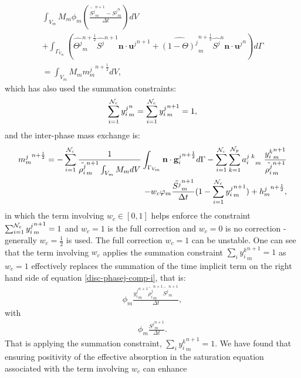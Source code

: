 \begin{eqnarray}
\int_{V_m} M_m \phi_m \left( \frac{
\tilde{ S^{j}}_m^{n+1} -
 {S^{j}}_m^n }
{\Delta t} \right) dV \\
+
\int_{\Gamma_{V_m}} \left(
\widehat{{\Theta}^j}_m^{n+\frac{1}{2}}
 \hat{S^{j}}^{n+1} \mathbf{n}\cdot {\mathbf{u}^{j}}^{n+1}
+
\widehat{{(1-\Theta)}^j}_m^{n+\frac{1}{2}}
 \hat{S^{j}}^n \mathbf{n}\cdot {\mathbf{u}^{j}}^{n}
 \right)  d\Gamma \\
= \int_{V_m} M_m {m^j_m}^{n+\frac{1}{2}} dV ,
\label{disc-phasej-sat-i}
\end{eqnarray}
which has also used the summation constraints:
\begin{eqnarray}
\sum_{i=1}^{{\cal N}_c} {y_{i}^{j}}_m^n=\sum_{i=1}^{{\cal N}_c} {y_{i}^{j}}_m^{n+1}=1,
\label{sum-constraint}
\end{eqnarray}
and the inter-phase mass exchange is:
\begin{eqnarray}
{m^j_m}^{n+\frac{1}{2}}= -\sum_{i=1}^{{\cal N}_c}
\frac{1}{ \tilde{\rho_{i}^{j}}_m^{n+1}\int_{V_m}M_m dV}
\int_{\Gamma_{V_m}}  \mathbf{n}\cdot{\mathbf{g}_i^{j}}^{n+\frac{1}{2}}d\Gamma
-\sum_{i=1}^{{\cal N}_c} \sum_{k=1}^{{\cal N}_p}{a_i^{j\;k}}_m \;
\frac{ {y_i^k}_m^{n+1} }{  \tilde{\rho_{i}^{j}}_m^{n+1}  }
\\
-w_c \phi_m\frac{\tilde{ S^j}_m^{n+1}}{\Delta t} (
1- \sum_{i=1}^{{\cal N}_c} { y_{i}^{j}}_m^{n+1}   )
+ {h^j_m}^{n+\frac{1}{2}}
,
\label{disc-mass-exchange}
\end{eqnarray}
in which the term involving $w_c\in [0, 1 ]$ helps enforce the constraint
$\sum_{i=1}^{{\cal N}_c} {y_{i}^{j}}_m^{n+1}=1$ and $w_c=1$ is the full correction
and $w_c=0$ is no correction - generally $w_c=\frac{1}{2}$ is used. The full correction
$w_c=1$ can be unstable. One can see that the term involving $w_c$ applies the summation
constraint $\sum_i {y_i^k}_m^{n+1}=1$ as $w_c=1$ effectively replaces the summation
of the time implicit term on
the right hand side of equation \ref{disc-phasej-comp-i}, that is:
\begin{eqnarray}
\phi_m  \frac{ {y_{i}^{j}}_m^{n+1}
\tilde{\rho_i^{j}}_m^{n+1} \tilde{S^{j}}_m^{n+1}  }
{\Delta t} ,
\end{eqnarray}
with
\begin{eqnarray}
\phi_m \frac{{ S^j}_m^{n+1}}{\Delta t}.
\end{eqnarray}
That is applying the summation constraint, $\sum_i {y_i^k}_m^{n+1}=1$.
We have found that ensuring positivity of the effective absorption
in the saturation equation associated with the term involving $w_c$ can enhance
